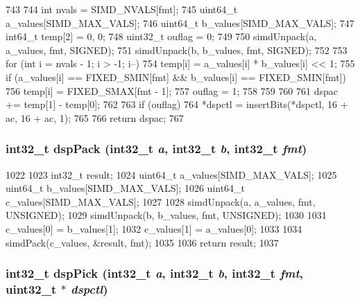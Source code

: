 \begin{DoxyCode}
743 {
744     int nvals = SIMD_NVALS[fmt];
745     uint64_t a_values[SIMD_MAX_VALS];
746     uint64_t b_values[SIMD_MAX_VALS];
747     int64_t temp[2] = {0, 0};
748     uint32_t ouflag = 0;
749 
750     simdUnpack(a, a_values, fmt, SIGNED);
751     simdUnpack(b, b_values, fmt, SIGNED);
752 
753     for (int i = nvals - 1; i > -1; i--) {
754         temp[i] = a_values[i] * b_values[i] << 1;
755         if (a_values[i] == FIXED_SMIN[fmt] && b_values[i] == FIXED_SMIN[fmt]) {
756             temp[i] = FIXED_SMAX[fmt - 1];
757             ouflag = 1;
758         }
759     }
760 
761     dspac += temp[1] - temp[0];
762 
763     if (ouflag)
764         *dspctl = insertBits(*dspctl, 16 + ac, 16 + ac, 1);
765 
766     return dspac;
767 }
\end{DoxyCode}
\hypertarget{namespaceMipsISA_a1af18d7c519e520651d9df60ec91b3ec}{
\subsubsection[{dspPack}]{\setlength{\rightskip}{0pt plus 5cm}int32\_\-t dspPack (int32\_\-t {\em a}, \/  int32\_\-t {\em b}, \/  int32\_\-t {\em fmt})}}
\label{namespaceMipsISA_a1af18d7c519e520651d9df60ec91b3ec}



\begin{DoxyCode}
1022 {
1023     int32_t result;
1024     uint64_t a_values[SIMD_MAX_VALS];
1025     uint64_t b_values[SIMD_MAX_VALS];
1026     uint64_t c_values[SIMD_MAX_VALS];
1027 
1028     simdUnpack(a, a_values, fmt, UNSIGNED);
1029     simdUnpack(b, b_values, fmt, UNSIGNED);
1030 
1031     c_values[0] = b_values[1];
1032     c_values[1] = a_values[0];
1033 
1034     simdPack(c_values, &result, fmt);
1035 
1036     return result;
1037 }
\end{DoxyCode}
\hypertarget{namespaceMipsISA_a774010022864d198d9ae706107ad49ea}{
\subsubsection[{dspPick}]{\setlength{\rightskip}{0pt plus 5cm}int32\_\-t dspPick (int32\_\-t {\em a}, \/  int32\_\-t {\em b}, \/  int32\_\-t {\em fmt}, \/  {\bf uint32\_\-t} $\ast$ {\em dspctl})}}
\label{namespaceMipsISA_a774010022864d198d9ae706107ad49ea}



